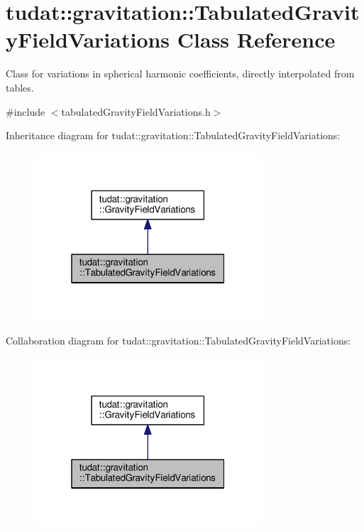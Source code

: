\hypertarget{classtudat_1_1gravitation_1_1TabulatedGravityFieldVariations}{}\section{tudat\+:\+:gravitation\+:\+:Tabulated\+Gravity\+Field\+Variations Class Reference}
\label{classtudat_1_1gravitation_1_1TabulatedGravityFieldVariations}


Class for variations in spherical harmonic coefficients, directly interpolated from tables.  




{\ttfamily \#include $<$tabulated\+Gravity\+Field\+Variations.\+h$>$}



Inheritance diagram for tudat\+:\+:gravitation\+:\+:Tabulated\+Gravity\+Field\+Variations\+:
\nopagebreak
\begin{figure}[H]
\begin{center}
\leavevmode
\includegraphics[width=241pt]{classtudat_1_1gravitation_1_1TabulatedGravityFieldVariations__inherit__graph}
\end{center}
\end{figure}


Collaboration diagram for tudat\+:\+:gravitation\+:\+:Tabulated\+Gravity\+Field\+Variations\+:
\nopagebreak
\begin{figure}[H]
\begin{center}
\leavevmode
\includegraphics[width=241pt]{classtudat_1_1gravitation_1_1TabulatedGravityFieldVariations__coll__graph}
\end{center}
\end{figure}
